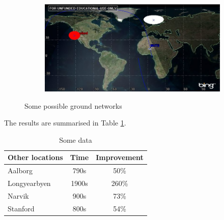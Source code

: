 \begin{figure}
\begin{subfigure}{.5\textwidth}
	\label{fig:range_ntnu_narvik}
\end{subfigure}
\begin{subfigure}{.5\textwidth}
	\centering
	\includegraphics[width=\textwidth]{Figures/range_ntnu_stanford}
	\label{fig:range_ntnu_narvik}
\end{subfigure}
\caption{Some possible ground networks}
\label{fig:ground_networks}
\end{figure}

The results are summarised in Table \ref{tab:networks}.

\begin{table}
	\begin{center}
	\begin{tabular}{l | c c}
  	Other locations & Time & Improvement \\
	\hline \hline
	Aalborg & 790s &  50\% \\
	\hline
	Longyearbyen & 1900s & 260\% \\
	\hline
	Narvik & 900s & 73\%  \\
	\hline
	Stanford & 800s & 54\% 
	\end{tabular}
	\end{center}
	\caption{Some data}
	\label{tab:networks}
\end{table}